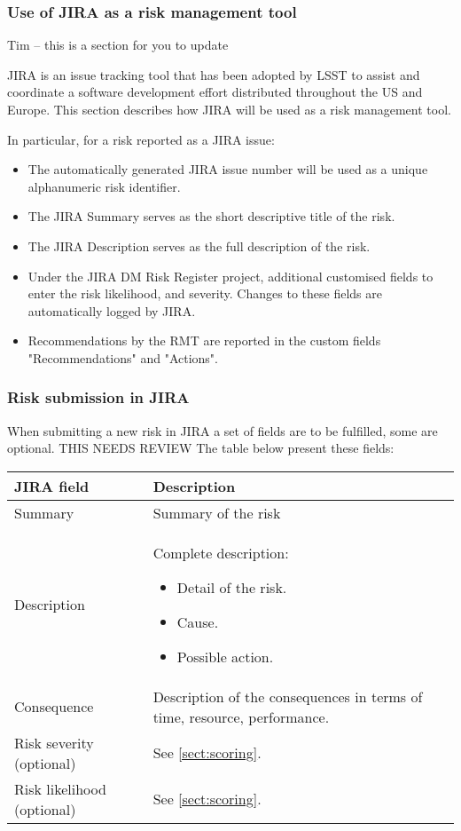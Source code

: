 \subsubsection{Use of JIRA as a risk management tool}

{\color{red} Tim -- this is a section for you to update}


JIRA is an issue tracking tool that has been adopted by LSST to assist and coordinate a software development effort distributed throughout the US and Europe. This section describes how JIRA will be used as a risk management tool.

In particular, for a risk reported as a JIRA issue:
\begin{itemize}
\item The automatically generated JIRA issue number will be used as a unique alphanumeric risk identifier.
\item The JIRA Summary serves as the short descriptive title of the risk.
\item The JIRA Description serves as the full description of the risk.
\item Under the JIRA DM Risk Register project, additional customised fields to enter the risk likelihood, and severity. Changes to these fields are automatically logged by JIRA.
\item Recommendations by the RMT are reported in the custom fields "Recommendations" and "Actions".
\end{itemize}


\subsubsection{Risk submission in JIRA}

 When submitting a new risk in JIRA a set of fields are to be fulfilled, some are optional.
{\color{red} THIS NEEDS REVIEW}
 The table below present these fields:
\begin{longtable}{|l|p{}|}\hline
\textbf{JIRA field} & \textbf{Description} \\ \hline
Summary    & Summary of the risk  \\ \hline
Description    & Complete description:
\begin{itemize}
  \item Detail of the risk.
  \item Cause.
  \item Possible action.
\end{itemize}
\\
\hline
Consequence  & Description of the consequences in terms of time, resource, performance.\\
\hline
Risk severity (optional)   & See \ref{sect:scoring}. \\
\hline
Risk likelihood (optional)   & See \ref{sect:scoring}. \\
\hline
\end{longtable}

